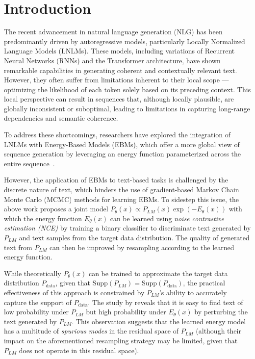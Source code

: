 \documentclass{article}
\begin{document}
\section{Introduction}

The recent advancement in natural language generation (NLG) has been predominantly driven by autoregressive models, particularly Locally Normalized Language Models (LNLMs). These models, including variations of Recurrent Neural Networks (RNNs) and the Transformer architecture, have shown remarkable capabilities in generating coherent and contextually relevant text. However, they often suffer from limitations inherent to their local scope --- optimizing the likelihood of each token solely based on its preceding context. This local perspective can result in sequences that, although locally plausible, are globally inconsistent or suboptimal, leading to limitations in capturing long-range dependencies and semantic coherence.

To address these shortcomings, researchers have explored the integration of LNLMs with Energy-Based Models (EBMs), which offer a more global view of sequence generation by leveraging an energy function parameterized across the entire sequence~\citep{wang2018learning,parshakova2019global,deng2019residual}. 

However, the application of EBMs to text-based tasks is challenged by the discrete nature of text, which hinders the use of gradient-based Markov Chain Monte Carlo (MCMC) methods for learning EBMs.
To sidestep this issue, the above work proposes a joint model $P_\theta(x) \propto P_{L M}(x) \exp \left(-E_\theta(x)\right)$ with which the energy function  $E_\theta(x)$ can be learned using \emph{noise contrastive estimation (NCE)} by training a binary classifier to discriminate text generated by $P_{L M}$ and text samples from the target data distribution. The quality of generated text from $P_{L M}$ can then be improved by resampling according to the learned energy function.


While theoretically \( P_\theta(x) \) can be trained to approximate the target data distribution \( P_\text{data} \), given that \( \text{Supp}(P_{LM}) = \text{Supp}(P_\text{data}) \), the practical effectiveness of this approach is constrained by \( P_{LM} \)'s ability to accurately capture the support of \( P_\text{data} \).
The study by \cite{bakhtin2019real} reveals that it is easy to find text of low probability under $P_{L M}$ but  high probability under  $E_\theta(x)$ by perturbing the text generated by $P_{L M}$. This observation suggests that the learned energy model has a multitude of \emph{spurious modes} in the residual space of \(P_{LM}\) (although their impact on the aforementioned resampling strategy may be limited, given that \(P_{LM}\) does not operate in this residual space).
\end{document}
